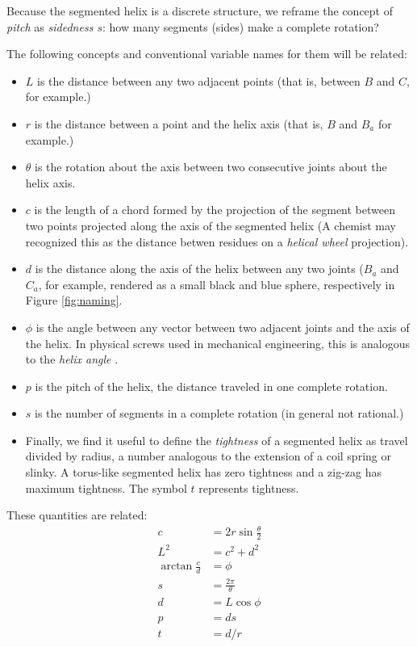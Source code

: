 \documentclass[11pt]{article}
\begin{document}
{Because the segmented helix is a discrete structure, we reframe the concept of {\em pitch} as {\em sidedness $s$}: how many segments (sides)
make a complete rotation?

The following concepts and conventional variable names for them will be related:
\begin{itemize}
\item $L$ is the distance between any two adjacent points (that is, between $B$ and $C$, for example.)
  \item $r$ is the distance between a point and the helix axis (that is, $B$ and $B_a$ for example.)
  \item $\theta$ is the rotation about the axis between two consecutive joints about the helix axis.
  \item $c$ is the length of a chord formed by the projection of the segment between two points projected along the axis of the segmented helix (A chemist may recognized this as the distance betwen residues on a {\em helical wheel} projection).
  \item $d$ is the distance along the axis of the helix between any two joints ($B_a$ and $C_a$, for example, rendered as a small black and blue
    sphere, respectively in Figure \ref{fig:naming}.
\item $\phi$ is the angle between any vector between two adjacent joints and the axis of the helix. In physical screws used in mechanical engineering, this is analogous to the {\em helix angle} \cite{wiki:helixangle}.
  \item $p$ is the pitch of the helix, the distance traveled in one complete rotation.
  \item $s$ is the number of segments in a complete rotation (in general not rational.)
\item  Finally, we find it useful to define the {\em tightness} of a segmented helix
as travel divided by radius, a number
analogous to the extension of a coil spring or slinky.
A torus-like segmented helix has zero tightness and a zig-zag has
maximum tightness. The symbol $t$ represents tightness.

  \end{itemize}
These quantities are related:
\begin{align}
    c &= 2r\sin{\frac{\theta}{2}} \\
    L^2 &= c^2+d^2  \\
    \arctan{\frac{c}{d}}  &= \phi \\
    s &= \frac{2 \pi}{\theta} \\
    d &= L \cos{\phi} \\
    p &= d s \\
    t &= d / r \\
\end{align}

}
\end{document}
